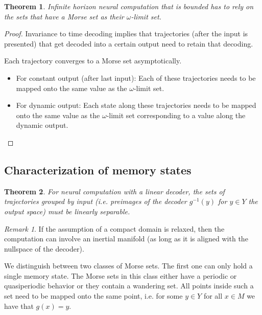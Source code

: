 \documentclass{scrartcl}
\newtheorem{theorem}{Theorem}
\theoremstyle{definition}
\theoremstyle{remark}
\newtheorem{remark}{Remark}
\begin{document}
\begin{theorem}	
Infinite horizon neural computation that is bounded has to rely on the sets that have a Morse set as their $\omega$-limit set.
\end{theorem}	

\begin{proof}
Invariance to time decoding implies that trajectories (after the input is presented) that get decoded into a certain output need to retain that decoding.

Each trajectory converges to a Morse set asymptotically.

\begin{itemize}
\item For constant output (after last input): Each of these trajectories needs to be mapped onto the same value as the $\omega$-limit set.
\item For dynamic output: Each state along these trajectories needs to be mapped onto the same value as the $\omega$-limit set corresponding to a value along the dynamic output. %
\end{itemize}
\end{proof}


\subsection{Characterization of memory states}

\begin{theorem}
For neural computation with a linear decoder, the sets of trajectories grouped by input (i.e. preimages of the decoder $g^{-1}(y)$ for $y\in Y$ the output space) must be linearly separable.
\end{theorem}

\begin{remark}
If the assumption of a compact domain is relaxed, then the computation can involve an inertial manifold (as long as it is aligned with the nullspace of the decoder).
\end{remark}

We distinguish between two classes of Morse sets.
The first one can only hold a single memory state. 
The Morse sets in this class either have a periodic or quasiperiodic behavior or they contain a wandering set.
All points inside such a set need to be mapped onto the same point, i.e. for some $y\in Y$ for all $x\in M$ we have that $g(x)=y$.
\end{document}
